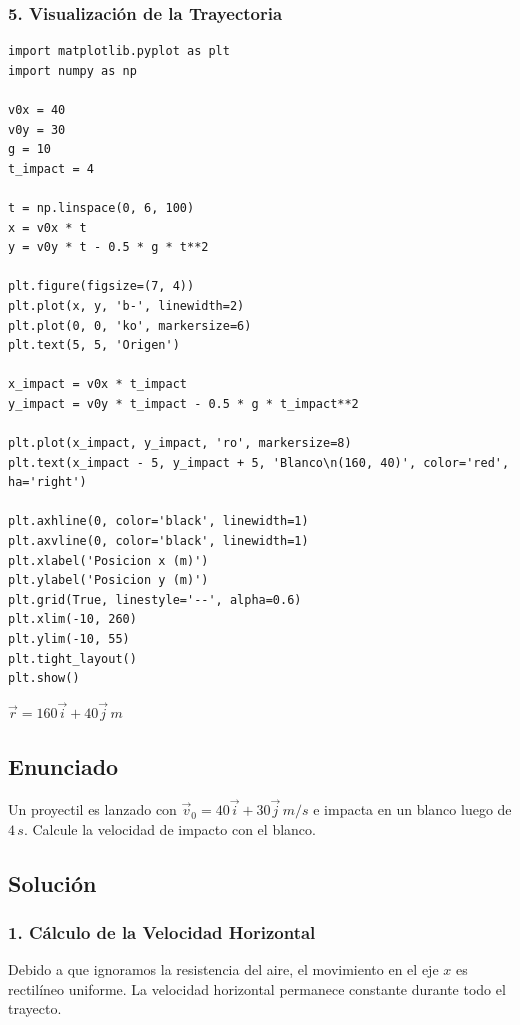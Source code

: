 \documentclass[12pt, a4paper]{article}
\begin{document}
\subsubsection*{5. Visualización de la Trayectoria}
\begin{lstlisting}
import matplotlib.pyplot as plt
import numpy as np

v0x = 40
v0y = 30
g = 10
t_impact = 4

t = np.linspace(0, 6, 100)
x = v0x * t
y = v0y * t - 0.5 * g * t**2

plt.figure(figsize=(7, 4))
plt.plot(x, y, 'b-', linewidth=2)
plt.plot(0, 0, 'ko', markersize=6)
plt.text(5, 5, 'Origen')

x_impact = v0x * t_impact
y_impact = v0y * t_impact - 0.5 * g * t_impact**2

plt.plot(x_impact, y_impact, 'ro', markersize=8)
plt.text(x_impact - 5, y_impact + 5, 'Blanco\n(160, 40)', color='red', ha='right')

plt.axhline(0, color='black', linewidth=1)
plt.axvline(0, color='black', linewidth=1)
plt.xlabel('Posicion x (m)')
plt.ylabel('Posicion y (m)')
plt.grid(True, linestyle='--', alpha=0.6)
plt.xlim(-10, 260)
plt.ylim(-10, 55)
plt.tight_layout()
plt.show()
\end{lstlisting}

\begin{tcolorbox}[colback=green!5!white, colframe=green!50!black, title=Respuesta Final]
\centering \Large $\vec{r} = 160\vec{i} + 40\vec{j} \, \si{m}$
\end{tcolorbox}

\newpage

\subsection*{Enunciado}
Un proyectil es lanzado con $\vec{v}_0 = 40\vec{i} + 30\vec{j} \, \si{m/s}$ e impacta en un blanco luego de $4 \, \si{s}$. Calcule la velocidad de impacto con el blanco.

\subsection*{Solución}

\subsubsection*{1. Cálculo de la Velocidad Horizontal}
Debido a que ignoramos la resistencia del aire, el movimiento en el eje $x$ es rectilíneo uniforme. La velocidad horizontal permanece constante durante todo el trayecto.
\end{document}
